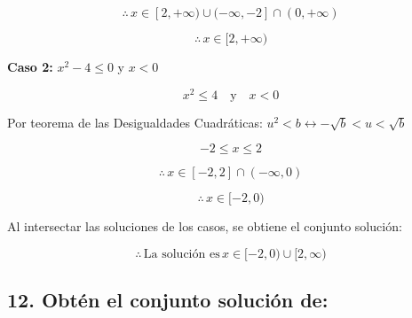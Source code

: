 \documentclass{article}
\begin{document}
\[
\therefore \, x \in [2, +\infty) \cup (-\infty, -2] \cap (0, +\infty)
\]

\[
\therefore \, x \in [2, +\infty)
\]

\textbf{Caso 2:} \(x^2-4 \leq 0\) y \(x < 0\)

\[
x^2 \leq 4 \quad \text{y} \quad x < 0
\]

Por teorema de las Desigualdades Cuadráticas: \(u^2 < b \leftrightarrow -\sqrt{b} < u < \sqrt{b}\)

\[
-2 \leq x \leq 2
\]

\[
\therefore \, x \in [-2, 2] \cap (-\infty, 0)
\]

\[
\therefore \, x \in [-2, 0)
\]

Al intersectar las soluciones de los casos, se obtiene el conjunto solución:

\[
\therefore \, \text{La solución es} \, x \in [-2, 0) \cup [2, \infty)
\]

\subsection*{12. Obtén el conjunto solución de:}
\end{document}
